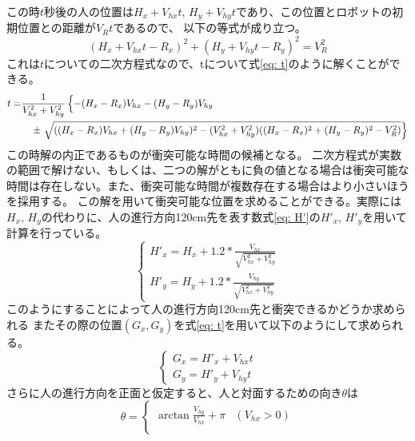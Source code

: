 \documentclass{kuisthesis}
\begin{document}
\begin{itemize}
\begin{table}[H]
\end{table}
この時$t$秒後の人の位置は$H_x + V_{hx}t$, $H_y + V_{hy}t$であり、この位置とロボットの初期位置との距離が$V_Rt$であるので、
以下の等式が成り立つ。\begin{equation}(H_x + V_{hx}t - R_x)^{2} + (H_y + V_{hy}t - R_y)^2 = V_R^2\end{equation}
これは$t$についての二次方程式なので、tについて式\ref{eq: t}のように解くことができる。
\scriptsize
\begin{equation}
  \label{eq: t}
  \begin{split}
  t = &\frac{1}{V_{hx}^2 + V_{hy}^2}\left\{-(H_x - R_x)V_{hx} - (H_y - R_y)V_{hy} \color{white}\sqrt{(a +(c+ b))}\color{black}\right. \\
  &  \quad \pm \left. \sqrt{((H_x - R_x)V_{hx} + (H_y - R_y)V_{hy})^2 - (V_{hx}^2 + V_{hy}^2)((H_x - R_x)^2 + (H_y - R_y)^2 - V_R^2)}\right\} 
  \end{split}
\end{equation}
\normalsize
\quad この時解の内正であるものが衝突可能な時間の候補となる。
二次方程式が実数の範囲で解けない、もしくは、二つの解がともに負の値となる場合は衝突可能な時間は存在しない。また、衝突可能な時間が複数存在する場合はより小さいほうを採用する。
この解を用いて衝突可能な位置を求めることができる。実際には$H_x$, $H_y$の代わりに、人の進行方向120cm先を表す数式\ref{eq: H'}の$H'_x$, $H'_y$を用いて計算を行っている。
\begin{equation}
  \label{eq: H'}
\left\{\begin{array}{l}
H'_x = H_x + 1.2*\frac{V_{hx}}{\sqrt{{V_{hx}^2 + V_{hy}^2}}}\\
H'_y = H_y + 1.2 * \frac{V_{hy}}{\sqrt{V_{hx}^2 + V_{hy}^2}}
\end{array}\right.
\end{equation}
このようにすることによって人の進行方向120cm先と衝突できるかどうか求められる
またその際の位置$(G_x, G_y)$を式\ref{eq: t}を用いて以下のようにして求められる。
\begin{equation}
  \label{eq: G}
\left\{\begin{array}{l}
G_x = H'_x + V_{hx}t\\
G_y = H'_y + V_{hy}t
\end{array}\right.
\end{equation}
さらに人の進行方向を正面と仮定すると、人と対面するための向き$\theta$は\\
\begin{equation}
  \label{eq: theta}
  \theta = 
  \begin{cases}
    \arctan{\frac{V_{hy}}{V_{hx}}}  + \pi & (V_{hx} > 0)\\

\end{cases}
\end{equation}
\end{itemize}
\end{document}
